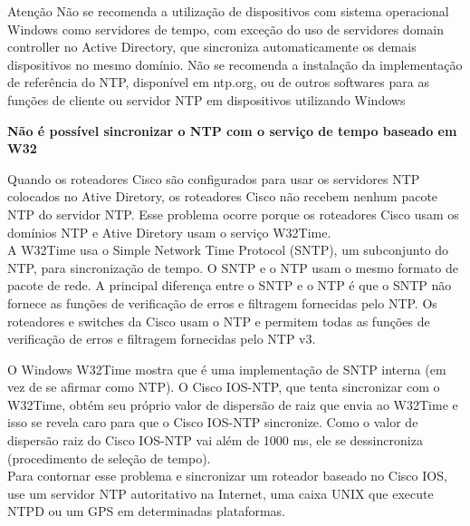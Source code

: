 \documentclass{if-beamer}
\begin{document}
\begin{frame}[allowframebreaks]{Atenção}
Não se recomenda a utilização de dispositivos com sistema operacional Windows como servidores de tempo, com exceção do uso de servidores domain controller no Active Directory, que sincroniza automaticamente os demais dispositivos no mesmo domínio. Não se recomenda a instalação da implementação de referência do NTP, disponível em ntp.org, ou de outros softwares para as funções de cliente ou servidor NTP em dispositivos utilizando Windows 
\framebreak

\textbf{Não é possível sincronizar o NTP com o serviço de tempo baseado em W32}

Quando os roteadores Cisco são configurados para usar os servidores NTP colocados no Ative Diretory, os roteadores Cisco não recebem nenhum pacote NTP do servidor NTP. Esse problema ocorre porque os roteadores Cisco usam os domínios NTP e Ative Diretory usam o serviço W32Time.\\

\framebreak
A W32Time usa o Simple Network Time Protocol (SNTP), um subconjunto do NTP, para sincronização de tempo. O SNTP e o NTP usam o mesmo formato de pacote de rede. A principal diferença entre o SNTP e o NTP é que o SNTP não fornece as funções de verificação de erros e filtragem fornecidas pelo NTP. Os roteadores e switches da Cisco usam o NTP e permitem todas as funções de verificação de erros e filtragem fornecidas pelo NTP v3. \\

\framebreak

O Windows W32Time mostra que é uma implementação de SNTP interna (em vez de se afirmar como NTP). O Cisco IOS-NTP, que tenta sincronizar com o W32Time, obtém seu próprio valor de dispersão de raiz que envia ao W32Time e isso se revela caro para que o Cisco IOS-NTP sincronize. Como o valor de dispersão raiz do Cisco IOS-NTP vai além de 1000 ms, ele se dessincroniza (procedimento de seleção de tempo). \\

\framebreak
Para contornar esse problema e sincronizar um roteador baseado no Cisco IOS, use um servidor NTP autoritativo na Internet, uma caixa UNIX que execute NTPD ou um GPS em determinadas plataformas. \\
\end{frame}
	
\end{document}
